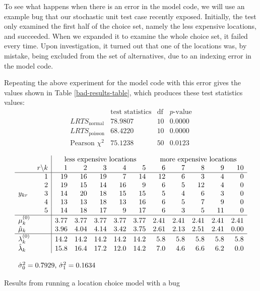 \documentclass{sig-alternate-preprint}
\begin{document}
To see what happens when there is an error in the model code, we will use an
example bug that our stochastic unit test case recently exposed.
Initially, the test only
examined the first half of the choice set, namely the less expensive locations,
and succeeded.  When we expanded it to examine the whole choice set, it failed
every time.  Upon investigation, it turned out that one of the locations was,
by mistake, being excluded from the set of alternatives, due to an indexing
error in the model code.

Repeating the above experiment for the model code with this error gives the
values shown in Table \ref{bad-results-table}, which produces these test
statistics values:
\[
\begin{array}{l|rrr}
& \text{test statistics} &\text{df} & p\text{-value} \\\hline
LRTS_{\text{normal}} & 78.9807 & 10 & 0.0000 \\
LRTS_{\text{poisson}} & 68.4220 & 10 & 0.0000 \\
\text{Pearson } \chi^2 & 75.1238 & 50 & 0.0123
\end{array}
\]

\begin{table}[t]
\[
\begin{array}{lr|rrrrrrrrrr}
&& \multicolumn{5}{c}{\text{less expensive locations}} & \multicolumn{5}{c}{\text{more expensive
      locations}} \\
& r \backslash k& 1 & 2 & 3 & 4 & 5 & 6 & 7 & 8 & 9 & 10 \\\hline
& 1 &19 & 16 & 19 & 7 & 14& 12 & 6 & 3 & 4 & 0\\
& 2 &19 &15& 14 &16 & 9 & 6 & 5 & 12 & 4 & 0\\
y_{kr} & 3 &14 &20 &18 &15 &15 & 5 & 4 & 6 & 3 & 0\\
& 4 &13 &13 &18 &13 &16 & 6 & 5 & 7 & 9 & 0\\
& 5 &14 &18 &17 & 9 &17 & 6 & 3 & 5 &11 & 0\\\hline
\mu_{k}^{(0)} & & 3.77 & 3.77 & 3.77 & 3.77 & 3.77 & 2.41 & 2.41 &2.41
      &2.41 & 2.41\\
\hat{\mu}_{k} & & 3.96 &  4.04 &  4.14 &  3.42 &  3.75 &
  2.61 &  2.13 &   2.51 & 2.41 &   0.00 \\\hline
\lambda_{k}^{(0)} & & 14.2  & 14.2 & 14.2 & 14.2 & 14.2
& 5.8 &  5.8 &  5.8 &  5.8 &  5.8\\
\hat{\lambda}_{k} & & 15.8 &  16.4 &  17.2 &  12.0 & 14.2 &   7.0 &
   4.6 &    6.6 &    6.2 &   0.0 \\
\\
\multicolumn{12}{l}{\hat{\sigma}_0^2 = 0.7929$, $\hat{\sigma}_1^2 = 0.1634}
\end{array}
\]
\caption{Results from running a location choice model with a bug}
\label{bad-results-table}
\end{table}
\end{document}
